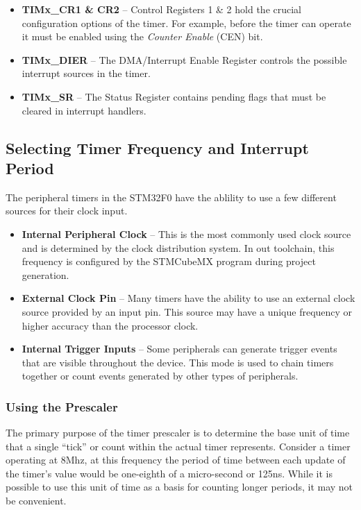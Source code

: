 \documentclass[11pt,fleqn]{book} %
\begin{document}
    \begin{itemize}
        \item \textbf{TIMx\_CR1 \& CR2} -- Control Registers 1 \& 2 hold the crucial configuration options of the timer. For example, before the timer can operate it must be enabled using the \textit{Counter Enable} (CEN) bit. 
        \item\textbf{TIMx\_DIER} -- The DMA/Interrupt Enable Register controls the possible interrupt sources in the timer.
        \item\textbf{TIMx\_SR} -- The Status Register contains pending flags that must be cleared in interrupt handlers.
    \end{itemize}

    \subsection{Selecting Timer Frequency and Interrupt Period}	
    The peripheral timers in the STM32F0 have the ablility to use a few different sources for their clock input. 
    \begin{itemize}
        \item\textbf{Internal Peripheral Clock} -- This is the most commonly used clock source and is determined by the clock distribution system. In out toolchain, this frequency is configured by the STMCubeMX program during project generation. 
        \item\textbf{External Clock Pin} -- Many timers have the ability to use an external clock source provided by an input pin. This source may have a unique frequency or higher accuracy than the processor clock.
        \item\textbf{Internal Trigger Inputs} -- Some peripherals can generate trigger events that are visible throughout the device. This mode is used to chain timers together or count events generated by other types of peripherals.
    \end{itemize}
 
    \subsubsection{Using the Prescaler}
      
        The primary purpose of the timer prescaler is to determine the base unit of time that a single ``tick'' or count within the actual timer represents. Consider a timer operating at 8Mhz, at this frequency the period of time between each update of the timer's value would be one-eighth of a micro-second or 125ns. While it is possible to use this unit of time as a basis for counting longer periods, it may not be convenient. 
        
\end{document}
